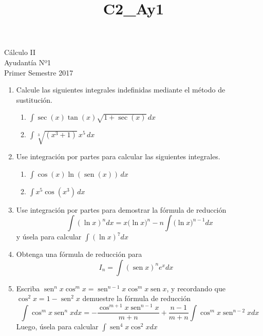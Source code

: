 \documentclass[a4paper,10pt]{article}
\title{C2_Ay1}
\newcommand{\dis}{\displaystyle}
\def\sin{\operatorname{sen}}
\begin{document}
\begin{center}
Cálculo II\\
Ayudantía Nº1\\
Primer Semestre 2017
\end{center}


\begin{enumerate}


\item Calcule las siguientes integrales indefinidas mediante el m\'{e}todo de
sustituci\'{o}n.
\begin{enumerate}[label=\emph{\alph*)}]
\item $\dis \int \sec(x) \tan(x)\sqrt{1+\sec(x)}\, dx$
\item $\dis \int \sqrt[3]{(x^3+1)}\, x^5\, dx$
\end{enumerate}

\item Use integraci\'{o}n por partes para calcular las siguientes
integrales.
\begin{enumerate}[label=\emph{\alph*)}]
\item $\dis \int \cos(x) \ln(\sin(x))\, dx$
\item $\dis \int x^5\cos(x^3)\, dx$
\end{enumerate}

\item  Use integraci\'{o}n por partes para demostrar  la f\'{o}rmula de reducci\'{o}n $$ \int(\ln x)^ndx=x\big(\ln x\big)^n-n\int\big(\ln x\big)^{n-1}dx$$ y
\'{u}sela para calcular $\dis \int(\ln x)^7dx$

\item Obtenga una f\'{o}rmula de reducci\'{o}n para
$$I_n= \int (\sin x)^n e^x dx\quad$$

\item Escriba $\displaystyle \sin^{n}x\cos^{m}x = \sin^{n-1}x\cos^{m}x\sin x$, y recordando que $\displaystyle \cos^{2}x = 1-\sin^{2}x$ demuestre la f\'{o}rmula de reducci\'{o}n
$$\int \cos^{m}x\sin^nxdx=-\frac{\cos^{m+1}x\sin^{n-1}x}{m+n}+\frac{n-1}{m+n}\int \cos^mx\sin^{n-2}xdx$$
Luego, \'{u}sela para calcular $\dis \int \sin^{4}x\cos^2x dx$




\end{enumerate}

\vspace{10mm}
\end{document}
